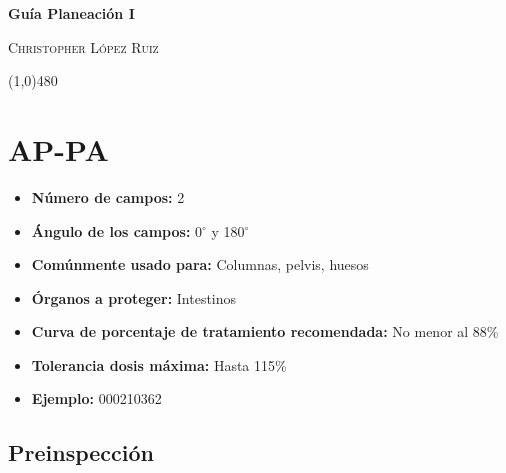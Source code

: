 \documentclass{article}
\begin{document}
\centerline{\Large \textbf{\textcolor{Grayo}{Guía Planeación I}}}
\vspace{2mm}
\centerline{\large \textsc{Christopher López Ruiz}}

\vspace{-10pt}

\begin{center}
\line(1,0){480}
\end{center}



\vspace{3pt}
%

\section{AP-PA}

\begin{center}
    \begin{tcolorbox}[colback=gray!25!white, colframe=gray, title=\textbf{Resumen}, width=0.8\linewidth, center title]
        \begin{itemize}
            \item \textbf{Número de campos:} 2
            \item \textbf{Ángulo de los campos:} 0$^{\circ}$ y 180$^{\circ}$
            \item \textbf{Comúnmente usado para:} Columnas, pelvis, huesos
            \item \textbf{Órganos a proteger:} Intestinos
            \item \textbf{Curva de porcentaje de tratamiento recomendada:} No menor al 88\%
            \item \textbf{Tolerancia dosis máxima:} Hasta 115\%
            \item \textbf{Ejemplo:} 000210362
        \end{itemize}
    \end{tcolorbox}
\end{center}

\subsection{Preinspección}
\end{document}
